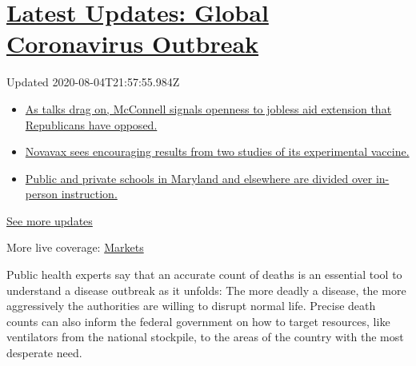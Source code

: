 \hypertarget{latest-updates-global-coronavirus-outbreak}{%
\section{\texorpdfstring{\href{https://www.nytimes3xbfgragh.onion/2020/08/04/world/coronavirus-cases.html?action=click\&pgtype=Article\&state=default\&region=MAIN_CONTENT_1\&context=storylines_live_updates}{Latest
Updates: Global Coronavirus
Outbreak}}{Latest Updates: Global Coronavirus Outbreak}}\label{latest-updates-global-coronavirus-outbreak}}

Updated 2020-08-04T21:57:55.984Z

\begin{itemize}
\tightlist
\item
  \href{https://www.nytimes3xbfgragh.onion/2020/08/04/world/coronavirus-cases.html?action=click\&pgtype=Article\&state=default\&region=MAIN_CONTENT_1\&context=storylines_live_updates\#link-2daa96b5}{As
  talks drag on, McConnell signals openness to jobless aid extension
  that Republicans have opposed.}
\item
  \href{https://www.nytimes3xbfgragh.onion/2020/08/04/world/coronavirus-cases.html?action=click\&pgtype=Article\&state=default\&region=MAIN_CONTENT_1\&context=storylines_live_updates\#link-1228a480}{Novavax
  sees encouraging results from two studies of its experimental
  vaccine.}
\item
  \href{https://www.nytimes3xbfgragh.onion/2020/08/04/world/coronavirus-cases.html?action=click\&pgtype=Article\&state=default\&region=MAIN_CONTENT_1\&context=storylines_live_updates\#link-4825b93}{Public
  and private schools in Maryland and elsewhere are divided over
  in-person instruction.}
\end{itemize}

\href{https://www.nytimes3xbfgragh.onion/2020/08/04/world/coronavirus-cases.html?action=click\&pgtype=Article\&state=default\&region=MAIN_CONTENT_1\&context=storylines_live_updates}{See
more updates}

More live coverage:
\href{https://www.nytimes3xbfgragh.onion/live/2020/08/04/business/stock-market-today-coronavirus?action=click\&pgtype=Article\&state=default\&region=MAIN_CONTENT_1\&context=storylines_live_updates}{Markets}

Public health experts say that an accurate count of deaths is an
essential tool to understand a disease outbreak as it unfolds: The more
deadly a disease, the more aggressively the authorities are willing to
disrupt normal life. Precise death counts can also inform the federal
government on how to target resources, like ventilators from the
national stockpile, to the areas of the country with the most desperate
need.

